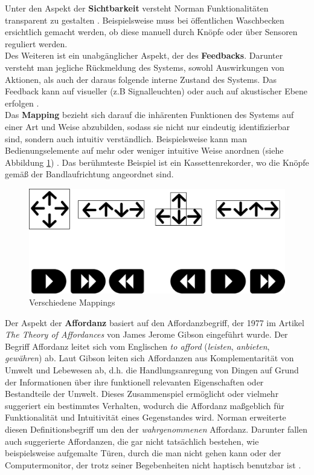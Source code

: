 \documentclass[parskip,headsepline, headtopline, %
footsepline, oneside, 12pt, headings=small]{scrreprt}
\begin{document}
Unter den Aspekt der \textbf{Sichtbarkeit} versteht Norman Funktionalitäten transparent zu gestalten \cite[Vgl. S.17ff]{don}. Beispielsweise muss bei öffentlichen Waschbecken ersichtlich gemacht werden, ob diese manuell durch Knöpfe oder über Sensoren reguliert werden.\\
   
Des Weiteren ist ein unabgänglicher Aspekt, der des \textbf{Feedbacks}. Darunter versteht man jegliche Rückmeldung des Systems, sowohl Auswirkungen von Aktionen, als auch der daraus folgende interne Zustand des Systems. Das Feedback kann auf visueller (z.B Signalleuchten) oder auch auf akustischer Ebene erfolgen \cite[Vgl. S.27ff]{don}.\\
 
Das	\textbf{Mapping} bezieht sich darauf die inhärenten Funktionen des Systems auf einer Art und Weise abzubilden, sodass sie nicht nur eindeutig identifizierbar sind, sondern auch intuitiv verständlich. Beispielsweise kann man Bedienungselemente auf mehr oder weniger intuitive Weise anordnen (siehe Abbildung \ref{fig:pfeil}) \cite[Vgl. S. 23ff]{don}. Das berühmteste Beispiel ist ein Kassettenrekorder, wo die Knöpfe gemäß der Bandlaufrichtung angeordnet sind.\\

\begin{figure}[h]
\center
\includegraphics[width=.55\textwidth]{images/arrowKeys.png}
\caption{Verschiedene Mappings}
\label{fig:pfeil}
\end{figure}

Der Aspekt der \textbf{Affordanz} basiert auf den Affordanzbegriff, der 1977 im Artikel \textit{The Theory of Affordances}\cite{gibson} von James Jerome Gibson eingeführt wurde. Der Begriff Affordanz leitet sich vom Englischen  \textit{\glqq to afford\grqq} (\textit{\glqq leisten\grqq}, \textit{\glqq anbieten\grqq}, \textit{\glqq gewähren\grqq}) ab. Laut Gibson leiten sich Affordanzen aus Komplementarität von Umwelt und Lebewesen ab, d.h.  
die Handlungsanregung von Dingen auf Grund der Informationen über ihre funktionell relevanten Eigenschaften oder Bestandteile der Umwelt. Dieses Zusammenspiel ermöglicht oder vielmehr suggeriert ein bestimmtes Verhalten, wodurch die Affordanz maßgeblich für Funktionalität und Intuitivität eines Gegenstandes wird.
Norman erweiterte diesen Definitionsbegriff um den der \textit{wahrgenommenen} Affordanz. Darunter fallen auch suggerierte Affordanzen, die gar nicht tatsächlich bestehen, wie beispielsweise aufgemalte Türen, durch die man nicht gehen kann oder der Computermonitor, der trotz seiner Begebenheiten nicht haptisch benutzbar ist \cite[Vgl. S.9ff]{don}.
\end{document}
